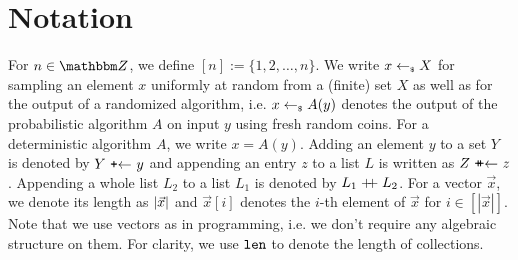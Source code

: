 
\section{Notation}\label{sec:prelims}
For $n \in\Z$, we define $[n] := \{1, 2, \ldots, n\}$. We write $x \gets_{\scriptscriptstyle\$} X$ for sampling an element $x$ uniformly at random from a (finite) set $X$ as well as for
the output of a randomized algorithm, i.e. $x\gets_{\scriptscriptstyle\$} A(y)$ denotes the output of the probabilistic algorithm $A$ on input
$y$ using fresh random coins. For a deterministic algorithm $A$, we write $x = A(y)$. Adding an element $y$ to a set $Y$
is denoted by $Y \ \texttt{+$\gets$}\  y$ and appending an entry $z$ to a list $L$ is written as $Z\ \texttt{+\!\!+$\gets$}\  z$. Appending a whole list
$L_2$ to a list $L_1$ is denoted by $L_1 \mathrel{+\!\!+} L_2$. For a vector
$\vec{x}$, we denote its length as $\lvert\vec{x}\rvert$ and $\vec{x}[i]$ denotes the $i$-th element of $\vec{x}$ for
$i\in[|\vec{x}|]$. Note that we use vectors as in programming, i.e. we don't require any algebraic structure on
them. For clarity, we use $\texttt{len}$ to denote the length of collections.

